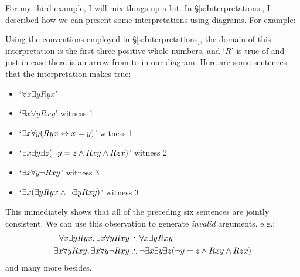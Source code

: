 \begin{earg}
For my third example, I will mix things up a bit. In §\ref{s:Interpretations}, I described how we can present some interpretations using diagrams. For example:
\begin{center}
\end{center}
Using the conventions employed in §\ref{s:Interpretations}, the domain of this interpretation is the first three positive whole numbers, and `$R$' is true of  and  just in case there is an arrow from  to  in our diagram. Here are some sentences that the interpretation makes true:
	\begin{itemize}
		\item `$\forall x \exists y Ryx$' 
		\item `$\exists x \forall y Rxy$' \hfill witness 1
		\item `$\exists x \forall y (Ryx \leftrightarrow x = y)$' \hfill witness 1
		\item `$\exists x \exists y \exists z (\neg y = z \wedge Rxy \wedge Rzx)$' \hfill witness 2
		\item `$\exists x \forall y \neg Rxy$' \hfill witness 3
		\item `$\exists x (\exists y Ryx \wedge \neg \exists y Rxy)$' \hfill witness 3
	\end{itemize}
This immediately shows that all of the preceding six sentences are jointly consistent. We can use this observation to generate \emph{invalid} arguments, e.g.:
	\begin{align*}
		\forall x \exists y Ryx, \exists x \forall y Rxy  &\mathrel{\therefore}  \forall x \exists y Rxy\\
		\exists x \forall y Rxy, \exists x \forall y \neg Rxy & \mathrel{\therefore} \neg \exists x \exists y \exists z (\neg y = z \wedge Rxy \wedge Rzx)
	\end{align*}
and many more besides.

\end{earg}
